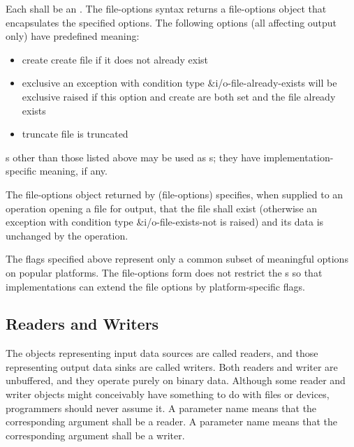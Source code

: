 \begin{entry}{%
}

Each  shall be an .
The {\cf file-options} syntax returns a file-options object that 
encapsulates the
specified options. The following options (all affecting output
only) have predefined meaning:

\begin{itemize}   
\item {\cf create} create file if it does not already exist
\item {\cf exclusive} an exception with condition type
  {\cf\&i/o-file-already-exists} will be exclusive raised if this
  option and {\cf create} are both set and the file already exists
\item {\cf truncate}
  file is truncated
\end{itemize}

s other than those listed above may be used as s;
they have implementation-specific meaning, if any.

The file-options object returned by {\cf (file-options)} specifies,
when supplied to an operation opening a file for output, that the file
shall exist (otherwise an exception with condition type
{\cf\&i/o-file-exists-not} is raised) and its data is unchanged by the
operation.

\begin{rationale}
  The flags specified above represent only a common subset of
  meaningful options on popular platforms.  The {\cf file-options}
  form does not restrict the s so that
  implementations can extend the file options by platform-specific
  flags.
\end{rationale}
\end{entry}   

\subsection{Readers and Writers}

The objects representing input data sources are called readers, and
those representing output data sinks are called writers.
Both readers and writer are unbuffered, and they operate purely on binary data.  
Although some
reader and writer objects might conceivably have something to do with
files or devices, programmers should never assume it.
A  parameter name means that the
corresponding argument shall be a reader.
A  parameter name means that the
corresponding argument shall be a writer.

